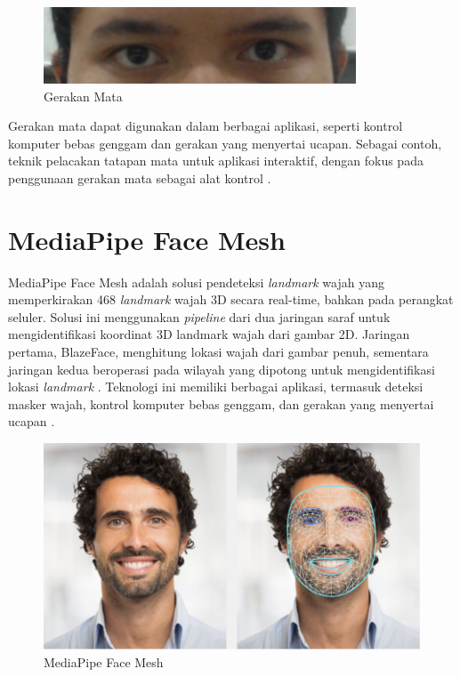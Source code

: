 \begin{figure} [ht] \centering
    \includegraphics[width=.6\textwidth]{gambar/bab3/gaze.png}
    \caption{Gerakan Mata}
    \label{fig:gaze}
\end{figure}

Gerakan mata dapat digunakan dalam berbagai aplikasi, seperti kontrol komputer bebas genggam  dan gerakan yang menyertai ucapan. Sebagai contoh, teknik pelacakan tatapan mata untuk aplikasi interaktif, dengan fokus pada penggunaan gerakan mata sebagai alat kontrol \parencite{Morimoto_Mimica_2005}. 

\section{MediaPipe Face Mesh}

MediaPipe Face Mesh adalah solusi pendeteksi \textit{landmark} wajah yang memperkirakan 468 \textit{landmark} wajah 3D secara real-time, bahkan pada perangkat seluler. Solusi ini menggunakan \textit{pipeline} dari dua jaringan saraf untuk mengidentifikasi koordinat 3D landmark wajah dari gambar 2D. Jaringan pertama, BlazeFace, menghitung lokasi wajah dari gambar penuh, sementara jaringan kedua beroperasi pada wilayah yang dipotong untuk mengidentifikasi lokasi \textit{landmark} \parencite{mediapipe_2020}. Teknologi ini memiliki berbagai aplikasi, termasuk deteksi masker wajah, kontrol komputer bebas genggam, dan gerakan yang menyertai ucapan \parencite{thaman_2022}.

\begin{figure} [ht] \centering
    \includegraphics[width=.55\textwidth]{gambar/face_landmark.png}
    \caption{MediaPipe Face Mesh}
    \label{fig:facemesh}
\end{figure}

